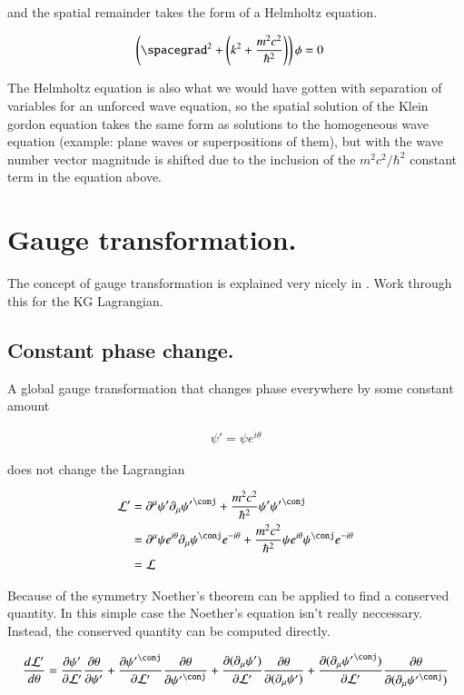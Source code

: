 \documentclass{article}
\begin{document}
and the spatial remainder takes the form of a Helmholtz equation.

\begin{align*}
\left( \spacegrad^2 + \left( k^2 + \frac{m^2 c^2}{\hbar^2} \right) \right) \phi &= 0
\end{align*}

The Helmholtz equation is also what we would have gotten with separation of variables for an unforced wave
equation, so the spatial solution of the Klein gordon equation takes the same form as solutions to the
homogeneous wave equation (example: plane waves or superpositions of them), but with the wave number vector magnitude is shifted due to the inclusion of
the $m^2 c^2/\hbar^2$ constant term in the equation above.

\section{ Gauge transformation. }

The concept of gauge transformation is explained very nicely in \cite{vtgauge}.  Work through this
for the KG Lagrangian.

\subsection{ Constant phase change. }

A global gauge transformation that changes phase everywhere by some constant amount

\begin{align*}
\psi' = \psi e^{i\theta}
\end{align*}

does not change the Lagrangian

\begin{align*}
\LL'
&= \partial^\mu \psi'  \partial_\mu {\psi'}^\conj + \frac{m^2 c^2}{\hbar^2}\psi' {\psi'}^\conj \\
&= \partial^\mu \psi e^{i\theta} \partial_\mu \psi^\conj e^{-i\theta} + \frac{m^2 c^2}{\hbar^2}\psi e^{i\theta}\psi^\conj e^{-i\theta} \\
&= \LL
\end{align*}

Because of the symmetry Noether's theorem can be applied to find a conserved quantity.  In this simple case the Noether's equation isn't really neccessary.
Instead, the conserved quantity can be computed directly.

\begin{align*}
\frac{d\LL'}{d\theta}
&=
\PD{\psi'}{\LL'} \PD{\theta}{\psi'}
+\PD{{\psi'}^\conj}{\LL'} \PD{\theta}{{\psi'}^\conj}
+\PD{(\partial_\mu \psi')}{\LL'} \PD{\theta}{(\partial_\mu \psi')}
+\PD{(\partial_\mu {\psi'}^\conj)}{\LL'} \PD{\theta}{(\partial_\mu {\psi'}^\conj)} \\
\end{align*}
\end{document}
